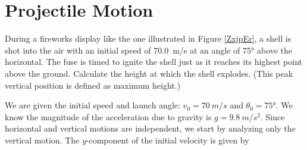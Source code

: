 \documentclass{article}
\begin{document}
\clearpage
\printnoidxglossaries


\clearpage

\section{Projectile Motion}




\begin{example} \label{4Dn9PW}
    During a fireworks display like the one illustrated in Figure \ref{ZxjpEr}, a shell is shot into the air with an initial speed of \SI{70.0}{m/s} at an angle of \ang{75} above the horizontal. The fuse is timed to ignite the shell just as it reaches its highest point above the ground. Calculate the height at which the shell explodes. (This peak vertical position is defined as \gls{maximum height}.)
\end{example}

\begin{center}
    \captionsetup{type=figure,margin=1in,font=scriptsize}
    \label{ZxjpEr}
\end{center}

\Solution We are given the initial speed and launch angle: $v_0 = \SI{70}{m/s}$ and $\theta_0 = \ang{75}$. We know the magnitude of the acceleration due to gravity is $g = \SI{9.8}{m/s^2}$. Since horizontal and vertical motions are independent, we start by analyzing only the vertical motion. The $y$-component of the initial velocity is given by
\end{document}
